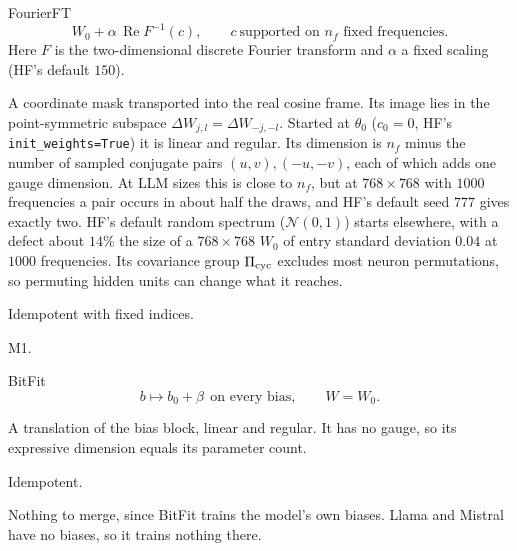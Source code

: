 \begin{example*}{FourierFT}\label{ex:fourierft}%
\[
  W_0+\alpha\,\operatorname{Re}F^{-1}(c),\qquad c\ \text{supported on $n_f$ fixed frequencies}.
\]
Here $F$ is the two-dimensional discrete Fourier transform and $\alpha$ a fixed scaling (HF's default $150$).
\begin{exVIIlines}
\item[Image] A coordinate mask transported into the real cosine frame. Its image lies in the point-symmetric
  subspace $\Delta W_{j,l}=\Delta W_{-j,-l}$. Started at $\theta_0$ ($c_0=0$, HF's \texttt{init\_weights=True}) it is linear
  and regular. Its dimension is $n_f$ minus the number of sampled conjugate pairs $(u,v),(-u,-v)$, each of which adds
  one gauge dimension. At LLM sizes this is close to $n_f$, but at $768\times768$ with $1000$ frequencies a pair occurs
  in about half the draws, and HF's default seed $777$ gives exactly two. HF's default random spectrum
  ($\mathcal N(0,1)$) starts elsewhere, with a defect about $14\%$ the size of a $768\times768$ $W_0$ of entry standard
  deviation $0.04$ at $1000$ frequencies. Its covariance group $\Pi_{\rm cyc}$ excludes most neuron permutations, so
  permuting hidden units can change what it reaches.
\item[Base] Idempotent with fixed indices.
\item[Merge] M1.
\end{exVIIlines}
\end{example*}

\begin{example*}{BitFit}\label{ex:bitfit}%
\[
  b\mapsto b_0+\beta\ \ \text{on every bias},\qquad W=W_0.
\]
\begin{exVIIlines}
\item[Image] A translation of the bias block, linear and regular. It has no gauge, so its expressive dimension equals
  its parameter count.
\item[Base] Idempotent.
\item[Merge] Nothing to merge, since BitFit trains the model's own biases. Llama and Mistral have no biases, so it
  trains nothing there.
\end{exVIIlines}
\end{example*}

